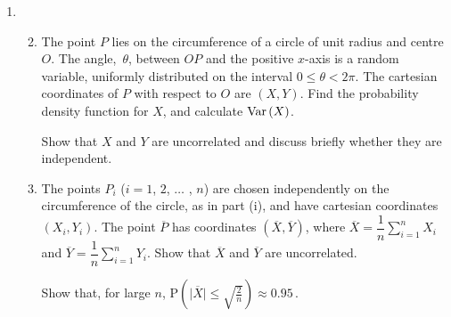 \documentclass[a4, 11pt]{report}
\newlength{\qspace}
\newcounter{qnumber}
\newenvironment{question}%
 {\vspace{\qspace}
  \begin{enumerate}[\bfseries 1\quad][10]%
    \setcounter{enumi}{\value{qnumber}}%
    \item%
 }
{
  \end{enumerate}
  \filbreak
  \stepcounter{qnumber}
 }
\newenvironment{questionparts}[1][1]%
 {
  \begin{enumerate}[\bfseries (i)]%
    \setcounter{enumii}{#1}
    \addtocounter{enumii}{-1}
    \setlength{\itemsep}{5mm}
    \setlength{\parskip}{8pt}
 }
 {
  \end{enumerate}
 }
\def\P{{\mathrm P}}
\def\le{\leqslant}
\def\var{{\rm Var}\,}
\begin{document}
\begin{question}
\begin{questionparts}
\item The point $P$ lies on the circumference of a circle of unit radius 
and centre $O$. The angle,~$\theta$,  between $OP$ and the 
positive $x$-axis is a random variable, uniformly 
distributed on  the interval  $0\le\theta<2\pi$.
The cartesian coordinates of $P$ with respect to $O$ are $(X, Y)$.
Find the probability density function for $X$, and calculate $\var (X)$.

Show that $X$ and $Y$ are uncorrelated and discuss briefly whether they
are independent.

\item The points $P_i$ ($i=1$, $2$, $\ldots$ , $n$)
are chosen independently on the circumference of the 
circle, as in part (i), and have cartesian coordinates $(X_i, Y_i)$. 
The point $\overline P$ has coordinates $(\overline X, \overline Y)$,
where 
$\overline X =\dfrac1n  \sum\limits _{i=1}^n X_i$
and
$\overline Y =\dfrac1n  \sum\limits _{i=1}^n Y_i$.
Show that $\overline X$ and $\overline Y$ 
are uncorrelated.

Show that, for large $n$, 
$\displaystyle \P\left(\vert \overline X \vert \le \sqrt{\frac2n}\right)
\approx 0.95\,$.

\end{questionparts}
\end{question}
\end{document}
